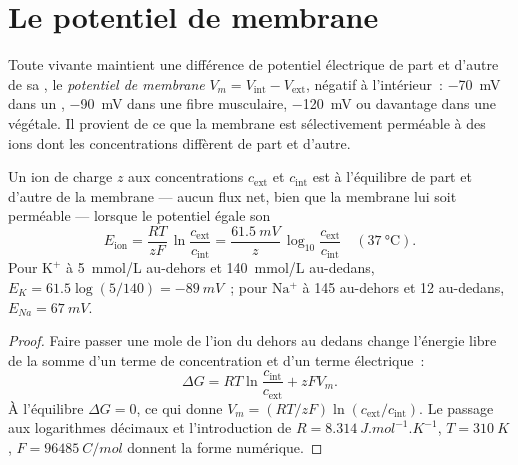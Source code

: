 \section{Le potentiel de membrane}

\begin{definition}\label{def:b1:membranes-transport:potential}
Toute  vivante maintient une différence de potentiel électrique
de part et d'autre de sa , le \emph{potentiel de
membrane} $V_m = V_{\text{int}} - V_{\text{ext}}$, négatif à l'intérieur~:
\qty{-70}{mV} dans un , \qty{-90}{mV} dans une fibre musculaire,
\qty{-120}{mV} ou davantage dans une  végétale. Il provient de ce
que la membrane est sélectivement perméable à des ions dont les
concentrations diffèrent de part et d'autre.
\end{definition}

\begin{theorem}\label{thm:b1:membranes-transport:nernst}
Un ion de charge $z$ aux concentrations $c_{\text{ext}}$ et
$c_{\text{int}}$ est à l'équilibre de part et d'autre de la membrane ---
aucun flux net, bien que la membrane lui soit perméable --- lorsque le
potentiel égale son \emph{}
\[
E_{\text{ion}} = \frac{RT}{zF}\,\ln\frac{c_{\text{ext}}}{c_{\text{int}}}
= \frac{\qty{61.5}{mV}}{z}\,\log_{10}\frac{c_{\text{ext}}}{c_{\text{int}}}
\quad (\qty{37}{\celsius}).
\]
Pour $\mathrm{K^+}$ à \qty{5}{mmol/L} au-dehors et \qty{140}{mmol/L}
au-dedans, $E_K = 61.5\log(5/140) = \qty{-89}{mV}$~; pour
$\mathrm{Na^+}$ à \qty{145}{} au-dehors et \qty{12}{} au-dedans,
$E_{Na} = \qty{+67}{mV}$.
\end{theorem}
\begin{proof}
Faire passer une mole de l'ion du dehors au dedans change l'énergie
libre de la somme d'un terme de concentration et d'un terme
électrique~:
\[
\Delta G = RT\ln\frac{c_{\text{int}}}{c_{\text{ext}}} + zFV_m .
\]
À l'équilibre $\Delta G = 0$, ce qui donne $V_m = (RT/zF)\ln(c_{\text{ext}}/c_{\text{int}})$.
Le passage aux logarithmes décimaux et l'introduction de $R = \qty{8.314}{J.mol^{-1}.K^{-1}}$,
$T = \qty{310}{K}$, $F = \qty{96485}{C/mol}$ donnent la forme numérique.
\end{proof}

